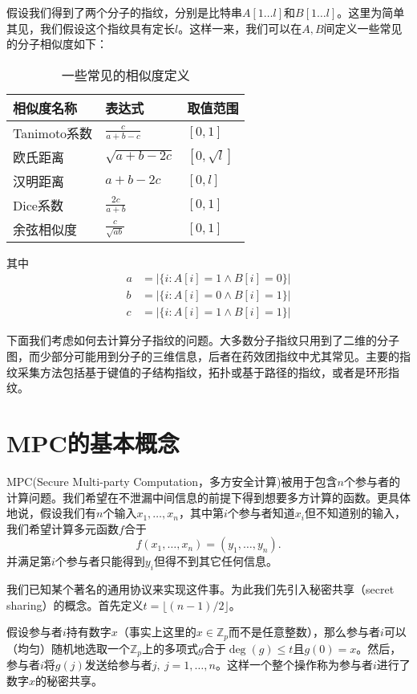 假设我们得到了两个分子的指纹，分别是比特串$A[1\dots l]$和$B[1\dots l]$。这里为简单其见，我们假设这个指纹具有定长$l$。这样一来，我们可以在$A,B$间定义一些常见的分子相似度如下：
\begin{table}[H]
	\centering
	\caption{一些常见的相似度定义\cite{CERETOMASSAGUE201558}}
	\begin{tabular}{l l l}
		\hline
		相似度名称 & 表达式 & 取值范围\\
		\hline
		Tanimoto系数 & $\frac{c}{a+b-c}$ & $[0,1]$\\
		欧氏距离 & $\sqrt{a+b-2c}$ & $[0,\sqrt{l}]$\\
		汉明距离 & $a+b-2c$ & $[0,l]$\\
		Dice系数 & $\frac{2c}{a+b}$ & $[0,1]$\\
		余弦相似度 & $\frac{c}{\sqrt{ab}}$ & $[0,1]$\\
		\hline
	\end{tabular}
\end{table}
其中
\begin{align*}
a&=|\{i:A[i]=1\wedge B[i]=0\}|\\
b&=|\{i:A[i]=0\wedge B[i]=1\}|\\
c&=|\{i:A[i]=1\wedge B[i]=1\}|
\end{align*}

下面我们考虑如何去计算分子指纹的问题\cite{CERETOMASSAGUE201558}。大多数分子指纹只用到了二维的分子图，而少部分可能用到分子的三维信息，后者在药效团指纹中尤其常见。主要的指纹采集方法包括基于键值的子结构指纹，拓扑或基于路径的指纹，或者是环形指纹。

\section{MPC的基本概念\cite{intro_to_mpc}}
MPC(Secure Multi-party Computation，多方安全计算)被用于包含$n$个参与者的计算问题。我们希望在不泄漏中间信息的前提下得到想要多方计算的函数。更具体地说，假设我们有$n$个输入$x_1,\dots,x_n$，其中第$i$个参与者知道$x_i$但不知道别的输入，我们希望计算多元函数$f$合于
$$
f(x_1,\dots,x_n)=(y_1,\dots,y_n).
$$
并满足第$i$个参与者只能得到$y_i$但得不到其它任何信息。

我们已知某个著名的通用协议来实现这件事。为此我们先引入秘密共享（secret sharing）的概念。首先定义$t=\lfloor(n-1)/2\rfloor$。

假设参与者$i$持有数字$x$（事实上这里的$x\in\mathbb{Z}_p$而不是任意整数），那么参与者$i$可以（均匀）随机地选取一个$\mathbb{Z}_p$上的多项式$g$合于$\deg(g)\leq t$且$g(0)=x$。然后，参与者$i$将$g(j)$发送给参与者$j,\ j=1,\dots,n$。这样一个整个操作称为参与者$i$进行了数字$x$的秘密共享。

